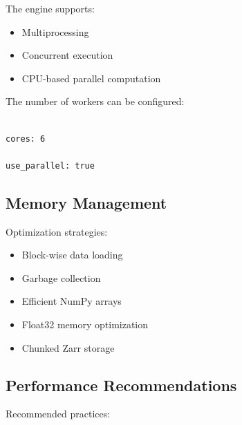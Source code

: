 \documentclass[11pt,a4paper]{article}
\begin{document}
The engine supports:


\begin{itemize}

\item Multiprocessing

\item Concurrent execution

\item CPU-based parallel computation

\end{itemize}



The number of workers can be configured:


\begin{verbatim}

cores: 6

use_parallel: true

\end{verbatim}




\subsection{Memory Management}



Optimization strategies:


\begin{itemize}

\item Block-wise data loading

\item Garbage collection

\item Efficient NumPy arrays

\item Float32 memory optimization

\item Chunked Zarr storage

\end{itemize}




\subsection{Performance Recommendations}



Recommended practices:
\end{document}
